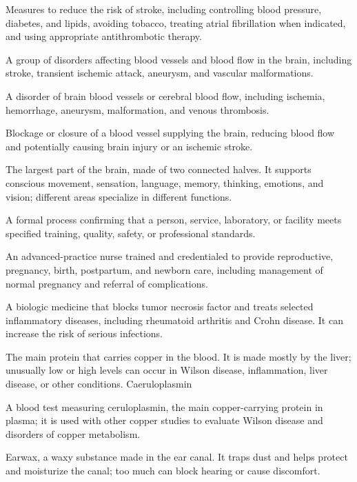  Measures to reduce the risk of stroke, including controlling blood pressure, diabetes, and lipids, avoiding tobacco, treating atrial fibrillation when indicated, and using appropriate antithrombotic therapy.

 A group of disorders affecting blood vessels and blood flow in the brain, including stroke, transient ischemic attack, aneurysm, and vascular malformations.

 A disorder of brain blood vessels or cerebral blood flow, including ischemia, hemorrhage, aneurysm, malformation, and venous thrombosis.

 Blockage or closure of a blood vessel supplying the brain, reducing blood flow and potentially causing brain injury or an ischemic stroke.

 The largest part of the brain, made of two connected halves. It supports conscious movement, sensation, language, memory, thinking, emotions, and vision; different areas specialize in different functions.

 A formal process confirming that a person, service, laboratory, or facility meets specified training, quality, safety, or professional standards.

 An advanced-practice nurse trained and credentialed to provide reproductive, pregnancy, birth, postpartum, and newborn care, including management of normal pregnancy and referral of complications.

 A biologic medicine that blocks tumor necrosis factor and treats selected inflammatory diseases, including rheumatoid arthritis and Crohn disease. It can increase the risk of serious infections.

 The main protein that carries copper in the blood. It is made mostly by the liver; unusually low or high levels can occur in Wilson disease, inflammation, liver disease, or other conditions.
\synonyms
Caeruloplasmin

 A blood test measuring ceruloplasmin, the main copper-carrying protein in plasma; it is used with other copper studies to evaluate Wilson disease and disorders of copper metabolism.

 Earwax, a waxy substance made in the ear canal. It traps dust and helps protect and moisturize the canal; too much can block hearing or cause discomfort.

